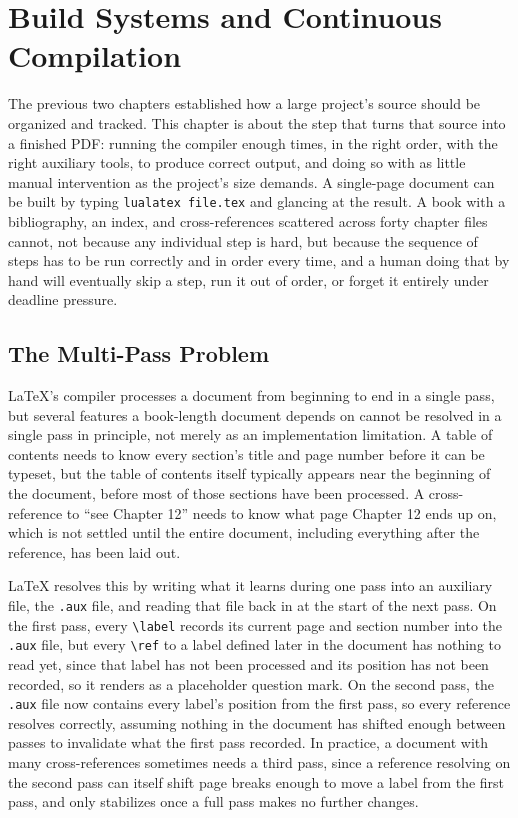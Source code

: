 \hypertarget{chapter-5-build-systems-and-continuous-compilation}{%
\chapter{Build Systems and Continuous Compilation}\label{chapter-5-build-systems-and-continuous-compilation}}

The previous two chapters established how a large project's source should be organized and tracked. This chapter is about the step that turns that source into a finished PDF: running the compiler enough times, in the right order, with the right auxiliary tools, to produce correct output, and doing so with as little manual intervention as the project's size demands. A single-page document can be built by typing \texttt{lualatex\ file.tex} and glancing at the result. A book with a bibliography, an index, and cross-references scattered across forty chapter files cannot, not because any individual step is hard, but because the sequence of steps has to be run correctly and in order every time, and a human doing that by hand will eventually skip a step, run it out of order, or forget it entirely under deadline pressure.

\hypertarget{the-multi-pass-problem}{%
\section{The Multi-Pass Problem}\label{the-multi-pass-problem}}

LaTeX's compiler processes a document from beginning to end in a single pass, but several features a book-length document depends on cannot be resolved in a single pass in principle, not merely as an implementation limitation. A table of contents needs to know every section's title and page number before it can be typeset, but the table of contents itself typically appears near the beginning of the document, before most of those sections have been processed. A cross-reference to ``see Chapter 12'' needs to know what page Chapter 12 ends up on, which is not settled until the entire document, including everything after the reference, has been laid out.

LaTeX resolves this by writing what it learns during one pass into an auxiliary file, the \texttt{.aux} file, and reading that file back in at the start of the next pass. On the first pass, every \texttt{\textbackslash{}label} records its current page and section number into the \texttt{.aux} file, but every \texttt{\textbackslash{}ref} to a label defined later in the document has nothing to read yet, since that label has not been processed and its position has not been recorded, so it renders as a placeholder question mark. On the second pass, the \texttt{.aux} file now contains every label's position from the first pass, so every reference resolves correctly, assuming nothing in the document has shifted enough between passes to invalidate what the first pass recorded. In practice, a document with many cross-references sometimes needs a third pass, since a reference resolving on the second pass can itself shift page breaks enough to move a label from the first pass, and only stabilizes once a full pass makes no further changes.

